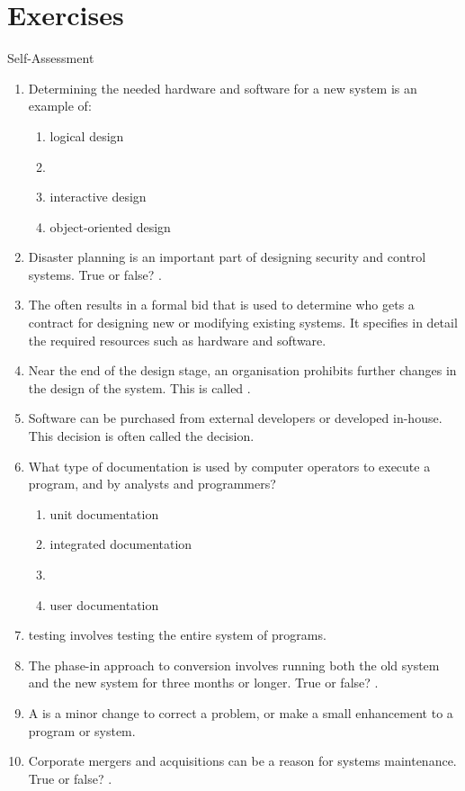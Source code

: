\documentclass[\main/notes.tex]{subfiles}
\begin{document}
		\section{Exercises}
			\begin{exercise}{Self-Assessment}
				\begin{enumerate}
					\item Determining the needed hardware and software for a new system is an example of:
						\begin{enumerate}[label=\alph*., nosep]
							\item logical design
							\item[\refstepcounter{enumii}\Circled{\alph{enumii}}] 
							\item interactive design
							\item object-oriented design
						\end{enumerate}
					\item Disaster planning is an important part of designing security and control systems. True or false? .
					\item The  often results in a formal bid that is used to determine who gets a contract for designing new or modifying existing systems. It specifies in detail the required resources such as hardware and software.
					\item Near the end of the design stage, an organisation prohibits further changes in the design of the system. This is called .
					\item Software can be purchased from external developers or developed in-house. This decision is often called the  decision.
					\item What type of documentation is used by computer operators to execute a program, and by analysts and programmers?
						\begin{enumerate}[label=\alph*., nosep]
							\item unit documentation
							\item integrated documentation
							\item[\refstepcounter{enumii}\Circled{\alph{enumii}}] 
							\item user documentation
						\end{enumerate}
					\item {} testing involves testing the entire system of programs.
					\item The phase-in approach to conversion involves running both the old system and the new system for three months or longer. True or false? .
					\item A  is a minor change to correct a problem, or make a small enhancement to a program or system.
					\item Corporate mergers and acquisitions can be a reason for systems maintenance. True or false? .
				\end{enumerate}
			\end{exercise}

	\vbox{}
\end{document}
